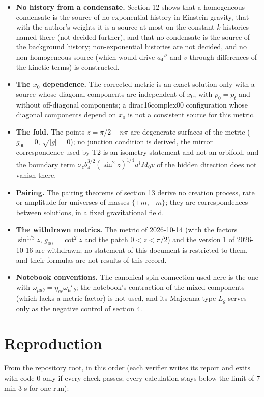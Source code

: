 \documentclass[11pt]{article}
\begin{document}
\begin{itemize}
\item \textbf{No history from a condensate.} Section 12 shows that a homogeneous condensate is the source of no exponential history in Einstein gravity, that with the author's weights it is a source at most on the constant-$k$ histories named there (not decided further), and that no condensate is the source of the background history; non-exponential histories are not decided, and no non-homogeneous source (which would drive $a_4''$ and $v$ through differences of the kinetic terms) is constructed.
\item \textbf{The $x_0$ dependence.} The corrected metric is an exact solution only with a source whose diagonal components are independent of $x_0$, with $p_0 = p_t$ and without off-diagonal components; a dirac16complex00 configuration whose diagonal components depend on $x_0$ is not a consistent source for this metric.
\item \textbf{The fold.} The points $z = \pi/2 + n\pi$ are degenerate surfaces of the metric ($g_{00} = 0$, $\sqrt{|g|} = 0$); no junction condition is derived, the mirror correspondence used by T2 is an isometry statement and not an orbifold, and the boundary term $\sigma_z b_4^{3/2}(\sin^2 z)^{1/4}u^\dagger M_0 v$ of the hidden direction does not vanish there.
\item \textbf{Pairing.} The pairing theorems of section 13 derive no creation process, rate or amplitude for universes of masses $\{+m, -m\}$; they are correspondences between solutions, in a fixed gravitational field.
\item \textbf{The withdrawn metrics.} The metric of 2026-10-14 (with the factors $\sin^{1/3}z$, $g_{00} = \cot^2 z$ and the patch $0 < z < \pi/2$) and the version 1 of 2026-10-16 are withdrawn; no statement of this document is restricted to them, and their formulas are not results of this record.
\item \textbf{Notebook conventions.} The canonical spin connection used here is the one with $\omega_{\mu ab} = \eta_{ac}\omega_\mu{}^c{}_b$; the notebook's contraction of the mixed components (which lacks a metric factor) is not used, and its Majorana-type $L_g$ serves only as the negative control of section 4.
\end{itemize}

\section{Reproduction}

From the repository root, in this order (each verifier writes its report and exits with code 0 only if every check passes; every calculation stays below the limit of 7 min 3 s for one run):
\end{document}
